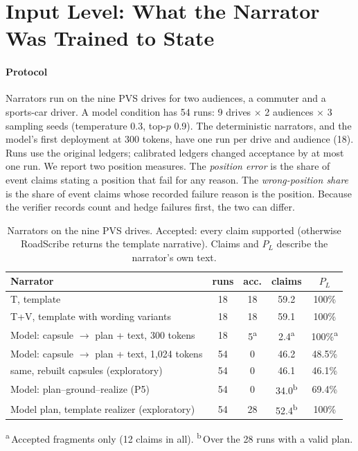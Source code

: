 \section{Input Level: What the Narrator Was Trained to State}
\label{sec:input}

\paragraph*{Protocol}
Narrators run on the nine PVS drives for two audiences, a commuter and a sports-car driver.
A model condition has 54 runs: 9 drives $\times$ 2 audiences $\times$ 3 sampling seeds (temperature 0.3, top-$p$ 0.9).
The deterministic narrators, and the model's first deployment at 300 tokens, have one run per drive and audience (18).
Runs use the original ledgers; calibrated ledgers changed acceptance by at most one run.
We report two position measures. The \emph{position error} is the share of event claims stating a position that fail for any reason. The \emph{wrong-position share} is the share of event claims whose recorded failure reason is the position. Because the verifier records count and hedge failures first, the two can differ.

\begin{table}[t]
\caption{Narrators on the nine PVS drives. Accepted: every claim supported (otherwise RoadScribe returns the template narrative). Claims and $P_L$ describe the narrator's own text.}
\label{tab:bench}
\centering
\scriptsize
\setlength{\tabcolsep}{2.5pt}
\begin{tabular}{@{}lcccc@{}}
\toprule
Narrator & runs & acc. & claims & $P_L$ \\
\midrule
T, template & 18 & 18 & 59.2 & 100\% \\
T+V, template with wording variants & 18 & 18 & 59.1 & 100\% \\
Model: capsule $\to$ plan + text, 300 tokens & 18 & 5\textsuperscript{a} & 2.4\textsuperscript{a} & 100\%\textsuperscript{a} \\
Model: capsule $\to$ plan + text, 1{,}024 tokens & 54 & 0 & 46.2 & 48.5\% \\
\quad same, rebuilt capsules (exploratory) & 54 & 0 & 46.1 & 46.1\% \\
Model: plan--ground--realize (P5) & 54 & 0 & 34.0\textsuperscript{b} & 69.4\% \\
Model plan, template realizer (exploratory) & 54 & 28 & 52.4\textsuperscript{b} & 100\% \\
\bottomrule
\end{tabular}

\smallskip
{\scriptsize\textsuperscript{a}\,Accepted fragments only (12 claims in all). \textsuperscript{b}\,Over the 28 runs with a valid plan.}
\end{table}


